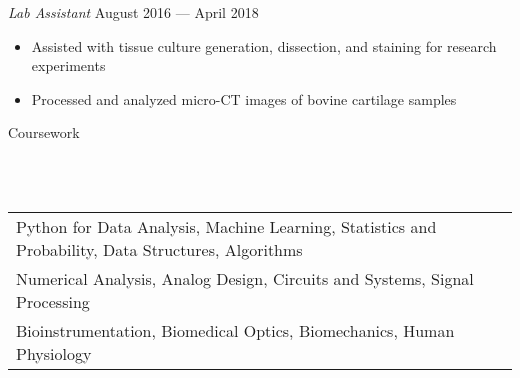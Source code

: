 \documentclass{article}
\newcommand{\lineunder} {
    \vspace*{-8pt} \\
    \hspace*{-18pt} \hrulefill \\
}
\newcommand{\header} [1] {
    {\hspace*{-18pt}\vspace*{6pt} \Large{#1} }
    \vspace*{-6pt} 
    \lineunder
}
\begin{document}

\textit{Lab Assistant} \hfill August 2016 --- April 2018\\
\vspace{-2mm}
\begin{itemize} \itemsep 0.05pt
	\item Assisted with tissue culture generation, dissection, and staining for research experiments
	\item Processed and analyzed micro-CT images of bovine cartilage samples
\end{itemize}

%
\vspace{5mm}
\header{Coursework}
\vspace{1mm}
\begin{tabular}{ l l }
	Python for Data Analysis, Machine Learning, Statistics and Probability, Data Structures, Algorithms \\
	Numerical Analysis, Analog Design, Circuits and Systems, Signal Processing \\
	Bioinstrumentation, Biomedical Optics, Biomechanics, Human Physiology
\end{tabular}
\vspace{5mm}

\end{document}
